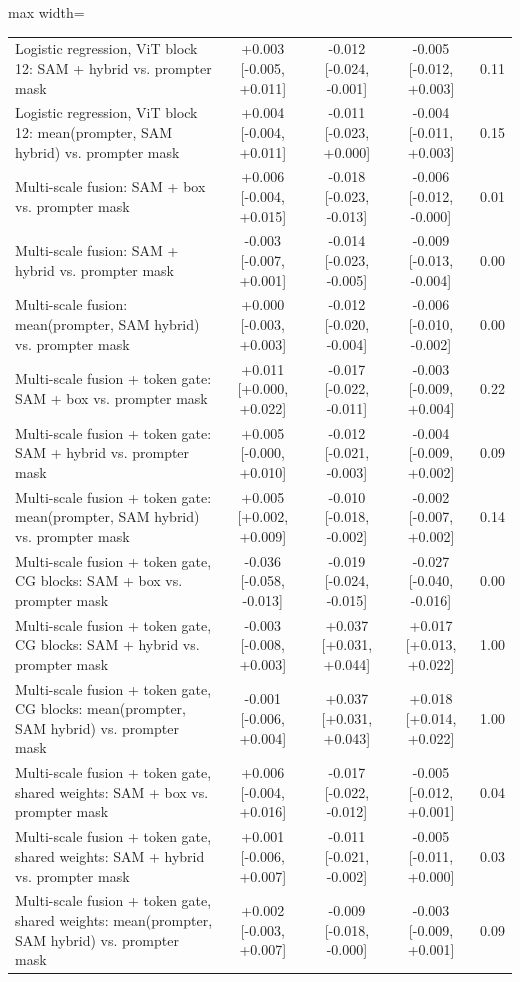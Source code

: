 \begin{table}[htbp]
\begin{adjustbox}{max width=\linewidth}
\begin{tabular}{lcccc}
Logistic regression, ViT block 12: SAM + hybrid vs. prompter mask & +0.003 [-0.005, +0.011] & -0.012 [-0.024, -0.001] & -0.005 [-0.012, +0.003] & 0.11 \\
Logistic regression, ViT block 12: mean(prompter, SAM hybrid) vs. prompter mask & +0.004 [-0.004, +0.011] & -0.011 [-0.023, +0.000] & -0.004 [-0.011, +0.003] & 0.15 \\
Multi-scale fusion: SAM + box vs. prompter mask & +0.006 [-0.004, +0.015] & -0.018 [-0.023, -0.013] & -0.006 [-0.012, -0.000] & 0.01 \\
Multi-scale fusion: SAM + hybrid vs. prompter mask & -0.003 [-0.007, +0.001] & -0.014 [-0.023, -0.005] & -0.009 [-0.013, -0.004] & 0.00 \\
Multi-scale fusion: mean(prompter, SAM hybrid) vs. prompter mask & +0.000 [-0.003, +0.003] & -0.012 [-0.020, -0.004] & -0.006 [-0.010, -0.002] & 0.00 \\
Multi-scale fusion + token gate: SAM + box vs. prompter mask & +0.011 [+0.000, +0.022] & -0.017 [-0.022, -0.011] & -0.003 [-0.009, +0.004] & 0.22 \\
Multi-scale fusion + token gate: SAM + hybrid vs. prompter mask & +0.005 [-0.000, +0.010] & -0.012 [-0.021, -0.003] & -0.004 [-0.009, +0.002] & 0.09 \\
Multi-scale fusion + token gate: mean(prompter, SAM hybrid) vs. prompter mask & +0.005 [+0.002, +0.009] & -0.010 [-0.018, -0.002] & -0.002 [-0.007, +0.002] & 0.14 \\
Multi-scale fusion + token gate, CG blocks: SAM + box vs. prompter mask & -0.036 [-0.058, -0.013] & -0.019 [-0.024, -0.015] & -0.027 [-0.040, -0.016] & 0.00 \\
Multi-scale fusion + token gate, CG blocks: SAM + hybrid vs. prompter mask & -0.003 [-0.008, +0.003] & +0.037 [+0.031, +0.044] & +0.017 [+0.013, +0.022] & 1.00 \\
Multi-scale fusion + token gate, CG blocks: mean(prompter, SAM hybrid) vs. prompter mask & -0.001 [-0.006, +0.004] & +0.037 [+0.031, +0.043] & +0.018 [+0.014, +0.022] & 1.00 \\
Multi-scale fusion + token gate, shared weights: SAM + box vs. prompter mask & +0.006 [-0.004, +0.016] & -0.017 [-0.022, -0.012] & -0.005 [-0.012, +0.001] & 0.04 \\
Multi-scale fusion + token gate, shared weights: SAM + hybrid vs. prompter mask & +0.001 [-0.006, +0.007] & -0.011 [-0.021, -0.002] & -0.005 [-0.011, +0.000] & 0.03 \\
Multi-scale fusion + token gate, shared weights: mean(prompter, SAM hybrid) vs. prompter mask & +0.002 [-0.003, +0.007] & -0.009 [-0.018, -0.000] & -0.003 [-0.009, +0.001] & 0.09 \\

\end{tabular}
\end{adjustbox}
\end{table}
